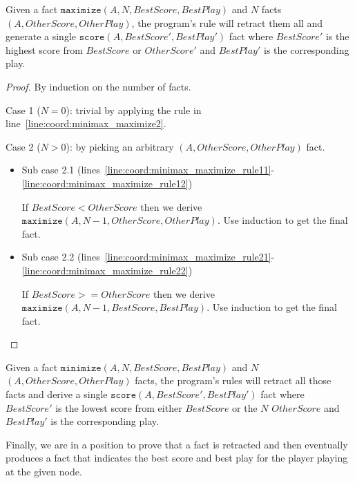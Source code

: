\begin{lemma}
Given a fact $\mathtt{maximize}(A, N, BestScore, BestPlay)$ and $N$ facts
$(A, OtherScore, OtherPlay)$, the program's rule will retract
them all and generate a single 
$\mathtt{score}(A, BestScore', BestPlay')$ fact where $BestScore'$ is the
highest score from $BestScore$ or $OtherScore'$ and
$BestPlay'$ is the corresponding play.
\end{lemma}
\begin{proof}
By induction on the number of  facts.

Case 1 ($N = 0$): trivial by applying the rule in
line~\ref{line:coord:minimax_maximize2}.

Case 2 ($N > 0$): by picking an arbitrary $(A, OtherScore,
OtherPlay)$ fact.

\begin{itemize}
   \item Sub case 2.1
      (lines~\ref{line:coord:minimax_maximize_rule11}-\ref{line:coord:minimax_maximize_rule12})

      If $BestScore < OtherScore$ then we derive $\mathtt{maximize}(A, N-1,
      OtherScore, OtherPlay)$. Use induction to get the final  fact.

   \item Sub case 2.2
      (lines~\ref{line:coord:minimax_maximize_rule21}-\ref{line:coord:minimax_maximize_rule22})

      If $BestScore >= OtherScore$ then we derive $\mathtt{maximize}(A, N-1,
      BestScore, BestPlay)$. Use induction to get the final  fact.

\end{itemize}

\end{proof}

\begin{lemma}
Given a fact $\mathtt{minimize}(A, N, BestScore, BestPlay)$ and $N$ 
$(A, OtherScore, OtherPlay)$ facts, the program's rules will
retract all those facts and derive a single
$\mathtt{score}(A, BestScore', BestPlay')$ fact where $BestScore'$ is the
lowest score from either $BestScore$ or the $N$ $OtherScore$ and
$BestPlay'$ is the corresponding play.
\end{lemma}

Finally, we are in a position to prove that a  fact is retracted and
then eventually produces a  fact that indicates the best score and
best play for the player playing at the given node.

